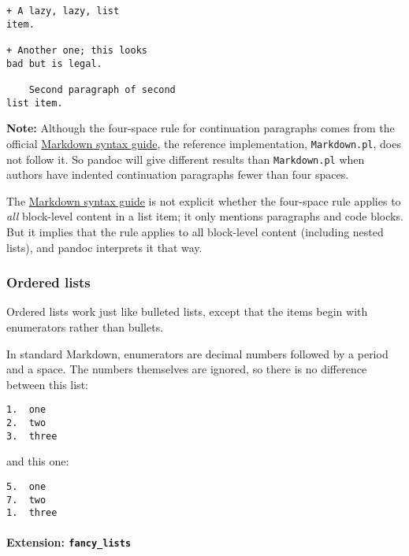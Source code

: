\documentclass[]{article}
\let\oldparagraph\paragraph
\renewcommand{\paragraph}[1]{\oldparagraph{#1}\mbox{}}
\begin{document}
\begin{verbatim}
+ A lazy, lazy, list
item.

+ Another one; this looks
bad but is legal.

    Second paragraph of second
list item.
\end{verbatim}

\textbf{Note:} Although the four-space rule for continuation paragraphs
comes from the official
\href{http://daringfireball.net/projects/markdown/syntax\#list}{Markdown
syntax guide}, the reference implementation, \texttt{Markdown.pl}, does
not follow it. So pandoc will give different results than
\texttt{Markdown.pl} when authors have indented continuation paragraphs
fewer than four spaces.

The
\href{http://daringfireball.net/projects/markdown/syntax\#list}{Markdown
syntax guide} is not explicit whether the four-space rule applies to
\emph{all} block-level content in a list item; it only mentions
paragraphs and code blocks. But it implies that the rule applies to all
block-level content (including nested lists), and pandoc interprets it
that way.

\hypertarget{ordered-lists}{\subsubsection{Ordered
lists}\label{ordered-lists}}

Ordered lists work just like bulleted lists, except that the items begin
with enumerators rather than bullets.

In standard Markdown, enumerators are decimal numbers followed by a
period and a space. The numbers themselves are ignored, so there is no
difference between this list:

\begin{verbatim}
1.  one
2.  two
3.  three
\end{verbatim}

and this one:

\begin{verbatim}
5.  one
7.  two
1.  three
\end{verbatim}

\paragraph{\texorpdfstring{Extension:
\texttt{fancy\_lists}}{Extension: fancy\_lists}}\label{extension-fancy_lists}
\end{document}
